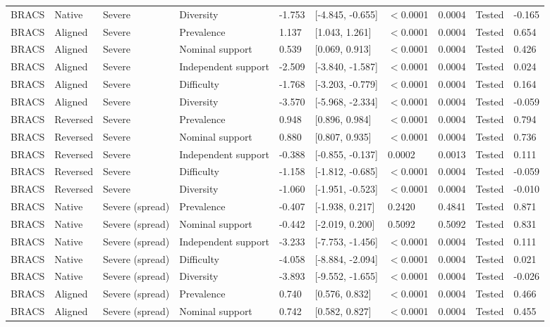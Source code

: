 \begin{longtable}{llllllllll}
BRACS & Native & Severe & Diversity & -1.753 & [-4.845, -0.655] & $<$0.0001 & 0.0004 & Tested & -0.165 \\
BRACS & Aligned & Severe & Prevalence & 1.137 & [1.043, 1.261] & $<$0.0001 & 0.0004 & Tested & 0.654 \\
BRACS & Aligned & Severe & Nominal support & 0.539 & [0.069, 0.913] & $<$0.0001 & 0.0004 & Tested & 0.426 \\
BRACS & Aligned & Severe & Independent support & -2.509 & [-3.840, -1.587] & $<$0.0001 & 0.0004 & Tested & 0.024 \\
BRACS & Aligned & Severe & Difficulty & -1.768 & [-3.203, -0.779] & $<$0.0001 & 0.0004 & Tested & 0.164 \\
BRACS & Aligned & Severe & Diversity & -3.570 & [-5.968, -2.334] & $<$0.0001 & 0.0004 & Tested & -0.059 \\
BRACS & Reversed & Severe & Prevalence & 0.948 & [0.896, 0.984] & $<$0.0001 & 0.0004 & Tested & 0.794 \\
BRACS & Reversed & Severe & Nominal support & 0.880 & [0.807, 0.935] & $<$0.0001 & 0.0004 & Tested & 0.736 \\
BRACS & Reversed & Severe & Independent support & -0.388 & [-0.855, -0.137] & 0.0002 & 0.0013 & Tested & 0.111 \\
BRACS & Reversed & Severe & Difficulty & -1.158 & [-1.812, -0.685] & $<$0.0001 & 0.0004 & Tested & -0.059 \\
BRACS & Reversed & Severe & Diversity & -1.060 & [-1.951, -0.523] & $<$0.0001 & 0.0004 & Tested & -0.010 \\
BRACS & Native & Severe (spread) & Prevalence & -0.407 & [-1.938, 0.217] & 0.2420 & 0.4841 & Tested & 0.871 \\
BRACS & Native & Severe (spread) & Nominal support & -0.442 & [-2.019, 0.200] & 0.5092 & 0.5092 & Tested & 0.831 \\
BRACS & Native & Severe (spread) & Independent support & -3.233 & [-7.753, -1.456] & $<$0.0001 & 0.0004 & Tested & 0.111 \\
BRACS & Native & Severe (spread) & Difficulty & -4.058 & [-8.884, -2.094] & $<$0.0001 & 0.0004 & Tested & 0.021 \\
BRACS & Native & Severe (spread) & Diversity & -3.893 & [-9.552, -1.655] & $<$0.0001 & 0.0004 & Tested & -0.026 \\
BRACS & Aligned & Severe (spread) & Prevalence & 0.740 & [0.576, 0.832] & $<$0.0001 & 0.0004 & Tested & 0.466 \\
BRACS & Aligned & Severe (spread) & Nominal support & 0.742 & [0.582, 0.827] & $<$0.0001 & 0.0004 & Tested & 0.455 \\

\end{longtable}
